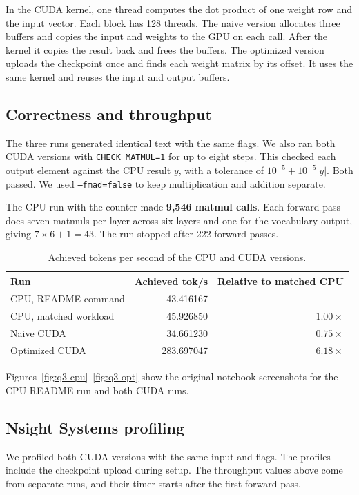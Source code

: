 \documentclass[11pt,a4paper]{article}
\begin{document}
In the CUDA kernel, one thread computes the dot product of one weight row and the input vector. Each block has 128 threads. The naive version allocates three buffers and copies the input and weights to the GPU on each call. After the kernel it copies the result back and frees the buffers. The optimized version uploads the checkpoint once and finds each weight matrix by its offset. It uses the same kernel and reuses the input and output buffers.

\subsection*{Correctness and throughput}
The three runs generated identical text with the same flags. We also ran both CUDA versions with \texttt{CHECK\_MATMUL=1} for up to eight steps. This checked each output element against the CPU result \(y\), with a tolerance of \(10^{-5}+10^{-5}|y|\). Both passed. We used \texttt{--fmad=false} to keep multiplication and addition separate.

The CPU run with the counter made \textbf{9,546 matmul calls}. Each forward pass does seven matmuls per layer across six layers and one for the vocabulary output, giving \(7\times6+1=43\). The run stopped after 222 forward passes.

\begin{table}[H]
\centering
\begin{tabular}{@{}lrr@{}}
\toprule
\textbf{Run} & \textbf{Achieved tok/s} & \textbf{Relative to matched CPU} \\
\midrule
CPU, README command & 43.416167 & --- \\
CPU, matched workload & 45.926850 & \(1.00\times\) \\
Naive CUDA & 34.661230 & \(0.75\times\) \\
Optimized CUDA & 283.697047 & \(6.18\times\) \\
\bottomrule
\end{tabular}
\caption{Achieved tokens per second of the CPU and CUDA versions.}
\label{tab:q3-toks}
\end{table}

Figures~\ref{fig:q3-cpu}--\ref{fig:q3-opt} show the original notebook screenshots for the CPU README run and both CUDA runs.

\subsection*{Nsight Systems profiling}
We profiled both CUDA versions with the same input and flags. The profiles include the checkpoint upload during setup. The throughput values above come from separate runs, and their timer starts after the first forward pass.
\end{document}

